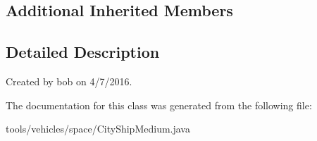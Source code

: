 \subsection*{Additional Inherited Members}


\subsection{Detailed Description}
Created by bob on 4/7/2016. 

The documentation for this class was generated from the following file\+:\begin{DoxyCompactItemize}
\item 
tools/vehicles/space/City\+Ship\+Medium.\+java\end{DoxyCompactItemize}
